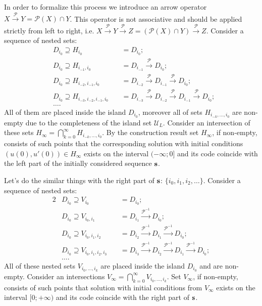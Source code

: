 In order to formalize this process we introduce an arrow operator $X \xrightarrow{\mathcal{P}} Y = \mathcal{P}(X) \cap Y$.
This operator is not associative and should be applied strictly from left to right, i.e. $X \xrightarrow{\mathcal{P}} Y \xrightarrow{\mathcal{P}} Z = (\mathcal{P}(X) \cap Y) \xrightarrow{\mathcal{P}} Z$.
Consider a sequence of nested sets:
\begin{equation}
	\begin{alignedat}{2}
		& D_{i_0} \supseteq H_{i_0} && \ = D_{i_0}; \\
		& D_{i_0} \supseteq H_{i_{-1}, i_0} && \ = D_{i_{-1}} \xrightarrow{\mathcal{P}} D_{i_0}; \\
		& D_{i_0} \supseteq H_{i_{-2}, i_{-1}, i_0} && \ = D_{i_{-2}} \xrightarrow{\mathcal{P}} D_{i_{-1}} \xrightarrow{\mathcal{P}} D_{i_0}; \\
		& D_{i_0} \supseteq H_{i_{-3}, i_{-2}, i_{-1}, i_0} && \ = D_{i_{-3}} \xrightarrow{\mathcal{P}} D_{i_{-2}} \xrightarrow{\mathcal{P}} D_{i_{-1}} \xrightarrow{\mathcal{P}} D_{i_0}; \\
		& \dots.
	\end{alignedat}
\label{eq:nested-h-sets}
\end{equation}
All of them are placed inside the island $D_{i_0}$, moreover all of sets $H_{i_{-k}, \dots, i_0}$ are non-empty due to the completeness of the island set $\mathscr{U}_L$.
Consider an intersection of these sets $H_{\infty} = \bigcap_{k = 0}^{\infty} H_{i_{-k}, \dots, i_0}$.
By the construction result set $H_{\infty}$, if non-empty, consists of such points that the corresponding solution with initial conditions $(u(0), u'(0)) \in H_{\infty}$ exists on the interval $(-\infty; 0]$ and its code coincide with the left part of the initially considered sequence $\vb{s}$.

Let's do the similar things with the right part of $\vb{s}$: $\{ i_0, i_1, i_2, \dots \}$.
Consider a sequence of nested sets:
\begin{alignat*}{2}
	& D_{i_0} \supseteq V_{i_0} && \ = D_{i_0}; \\
	& D_{i_0} \supseteq V_{i_0, i_1} && \ = D_{i_1} \xrightarrow{\mathcal{P}^{-1}} D_{i_0}; \\
	& D_{i_0} \supseteq V_{i_0, i_1, i_2} && \ = D_{i_2} \xrightarrow{\mathcal{P}^{-1}} D_{i_1} \xrightarrow{\mathcal{P}^{-1}} D_{i_0}; \\
	& D_{i_0} \supseteq V_{i_0, i_1, i_2, i_3} && \ = D_{i_3} \xrightarrow{\mathcal{P}^{-1}} D_{i_2} \xrightarrow{\mathcal{P}^{-1}} D_{i_1} \xrightarrow{\mathcal{P}^{-1}} D_{i_0}; \\
	& \dots.
\end{alignat*}
All of these nested sets $V_{i_0, \dots, i_k}$ are placed inside the island $D_{i_0}$ and are non-empty.
Consider an intersections $V_{\infty} = \bigcap_{k = 0}^{\infty} V_{i_0, \dots, i_k}$.
Set $V_{\infty}$, if non-empty, consists of such points that solution with initial conditions from $V_{\infty}$ exists on the interval $[0; +\infty)$ and its code coincide with the right part of $\vb{s}$.


